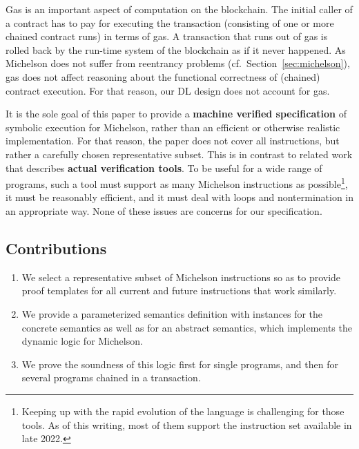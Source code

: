 Gas is an important aspect of computation on the blockchain. The
initial caller of a contract has to pay for executing the transaction
(consisting of one or more chained contract runs) in terms of gas.
A transaction that
runs out of gas is rolled back by the run-time system of the
blockchain as if it never happened. As Michelson does not
suffer from reentrancy problems (cf.\ Section~\ref{sec:michelson}),
gas does not affect reasoning about the functional correctness of
(chained) contract execution. For that reason,  our DL design does not
account for gas. 

It is the sole goal of this paper to provide a \textbf{machine
  verified specification} of symbolic execution for Michelson, rather than an
efficient or otherwise realistic implementation. For that reason, the
paper does not cover all instructions, but rather a carefully chosen
representative subset. This is in contrast to related work
\cite{micho,helmholtz,WHYtool} that describes \textbf{actual
verification tools}. To be useful for a wide range of programs, such a
tool must support as many Michelson instructions as
possible\footnote{Keeping up with the rapid evolution of the language is
  challenging for those tools. As of this writing, most of them support the instruction
  set available in late 2022.}, it must
be reasonably efficient, and it must deal with loops and
nontermination in an appropriate way. None of these issues are
concerns for our specification.

\subsection*{Contributions}
\label{sec:contributions}

\begin{enumerate}
\item We select a representative subset of Michelson
  instructions so as to provide proof templates for all 
  current and future instructions that work similarly.
\item We provide a parameterized semantics definition with instances
  for the concrete semantics as well as for an abstract semantics,
  which implements the dynamic logic for Michelson. 
\item We prove the soundness of this logic first for single programs,
  and then for several programs chained in a transaction.
\end{enumerate}

